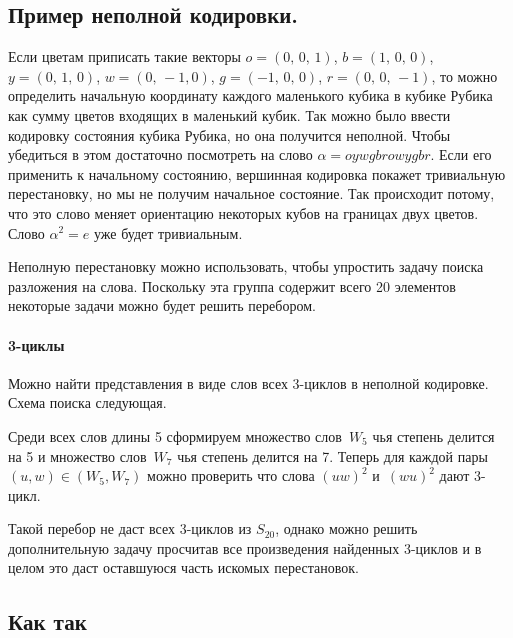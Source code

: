 \documentclass[a4paper, oneside]{book}
\begin{document}
\subsection{Пример неполной кодировки.} Если цветам приписать такие векторы
$o=(0,\,0,\,1)$, $b=(1,\,0,\,0)$, $y=(0,\,1,\,0)$, $w=(0,\,-1,0)$,
$g=(-1,\,0,\,0)$, $r=(0,\,0,\,-1)$, то можно определить начальную координату
каждого маленького кубика в кубике Рубика как сумму цветов входящих в маленький
кубик. Так можно было ввести кодировку состояния кубика Рубика, но она
получится неполной. Чтобы убедиться в этом достаточно посмотреть на слово
$\alpha = oywgbrowygbr$. Если его применить к начальному состоянию, вершинная
кодировка покажет тривиальную перестановку, но мы не получим начальное
состояние. Так происходит потому, что это слово меняет ориентацию некоторых
кубов на границах двух цветов. Слово $\alpha^2=e$ уже будет тривиальным.

Неполную перестановку можно использовать, чтобы упростить задачу поиска разложения на слова. Поскольку эта группа содержит всего 20 элементов некоторые задачи можно будет решить перебором.

\paragraph{3-циклы}
Можно найти представления в виде слов всех 3-циклов в неполной кодировке. Схема поиска следующая. 

Среди всех слов длины 5 сформируем множество слов~$W_5$ чья степень делится на 5 и множество слов~$W_7$ чья степень делится на 7. Теперь для каждой пары $(u, w) \in (W_5, W_7)$ можно проверить что слова $(uw)^2$ и~$(wu)^2$ дают 3-цикл.

Такой перебор не даст всех 3-циклов из $S_20$, однако можно решить дополнительную задачу просчитав все произведения найденных 3-циклов и в целом это даст оставшуюся часть искомых перестановок.




\subsection{Как так}
\end{document}
